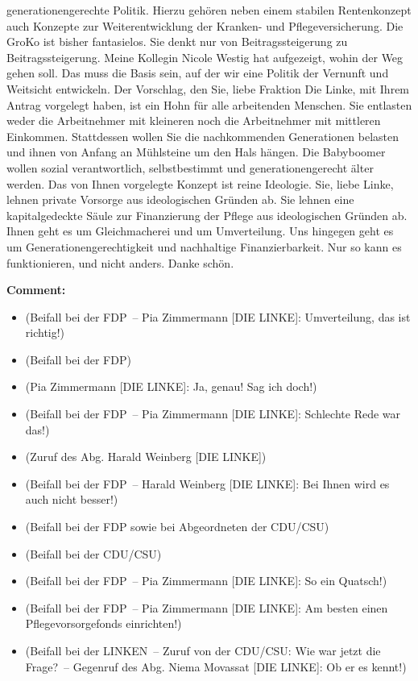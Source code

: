 \documentclass{article}
\begin{document}
generationengerechte Politik.  Hierzu gehören neben einem stabilen Rentenkonzept auch Konzepte zur Weiterentwicklung der Kranken- und Pflegeversicherung. Die GroKo ist bisher fantasielos. Sie denkt nur von Beitragssteigerung zu Beitragssteigerung. Meine Kollegin Nicole Westig hat aufgezeigt, wohin der Weg gehen soll. Das muss die Basis sein, auf der wir eine Politik der Vernunft und Weitsicht entwickeln. Der Vorschlag, den Sie, liebe Fraktion Die Linke, mit Ihrem Antrag vorgelegt haben, ist ein Hohn für alle arbeitenden Menschen. Sie entlasten weder die Arbeitnehmer mit kleineren noch die Arbeitnehmer mit mittleren Einkommen. Stattdessen wollen Sie die nachkommenden Generationen belasten und ihnen von Anfang an Mühlsteine um den Hals hängen.  Die Babyboomer wollen sozial verantwortlich, selbstbestimmt und generationengerecht älter werden. Das von Ihnen vorgelegte Konzept ist reine Ideologie. Sie, liebe Linke, lehnen private Vorsorge aus ideologischen Gründen ab. Sie lehnen eine kapitalgedeckte Säule zur Finanzierung der Pflege aus ideologischen Gründen ab. Ihnen geht es um Gleichmacherei und um Umverteilung.  Uns hingegen geht es um Generationengerechtigkeit und nachhaltige Finanzierbarkeit. Nur so kann es funktionieren, und nicht anders. Danke schön.  

\noindent\textbf{Comment:}
\begin{itemize}
    \setlength\itemsep{-3pt}
    \item (Beifall bei der FDP – Pia Zimmermann [DIE LINKE]: Umverteilung, das ist richtig!)
    \setlength\itemsep{-3pt}
    \item (Beifall bei der FDP)
    \setlength\itemsep{-3pt}
    \item (Pia Zimmermann [DIE LINKE]: Ja, genau! Sag ich doch!)
    \setlength\itemsep{-3pt}
    \item (Beifall bei der FDP – Pia Zimmermann [DIE LINKE]: Schlechte Rede war das!)
    \setlength\itemsep{-3pt}
    \item (Zuruf des Abg. Harald Weinberg [DIE LINKE])
    \setlength\itemsep{-3pt}
    \item (Beifall bei der FDP – Harald Weinberg [DIE LINKE]: Bei Ihnen wird es auch nicht besser!)
    \setlength\itemsep{-3pt}
    \item (Beifall bei der FDP sowie bei Abgeordneten der CDU/CSU)
    \setlength\itemsep{-3pt}
    \item (Beifall bei der CDU/CSU)
    \setlength\itemsep{-3pt}
    \item (Beifall bei der FDP – Pia Zimmermann [DIE LINKE]: So ein Quatsch!)
    \setlength\itemsep{-3pt}
    \item (Beifall bei der FDP – Pia Zimmermann [DIE LINKE]: Am besten einen Pflegevorsorgefonds einrichten!)
    \setlength\itemsep{-3pt}
    \item (Beifall bei der LINKEN – Zuruf von der CDU/CSU: Wie war jetzt die Frage? – Gegenruf des Abg. Niema Movassat [DIE LINKE]: Ob er es kennt!)
\end{itemize}
\end{document}
